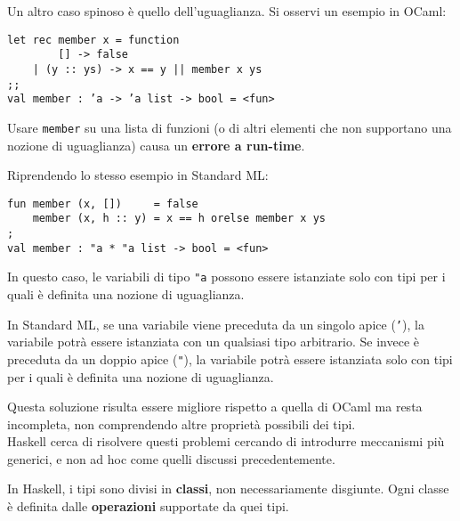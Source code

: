 \documentclass{article}
\begin{document}
\pagebreak

Un altro caso spinoso è quello dell'uguaglianza. Si osservi un esempio in OCaml:
\begin{tcolorbox}
\begin{verbatim}
let rec member x = function
        [] -> false
    | (y :: ys) -> x == y || member x ys
;;
val member : ’a -> ’a list -> bool = <fun>
\end{verbatim}
\end{tcolorbox}
Usare \texttt{member} su una lista di funzioni (o di altri elementi che non supportano una nozione di uguaglianza) causa un \textbf{errore a run-time}.

Riprendendo lo stesso esempio in Standard ML:
\begin{tcolorbox}
\begin{verbatim}
fun member (x, [])     = false
    member (x, h :: y) = x == h orelse member x ys
;
val member : "a * "a list -> bool = <fun>
\end{verbatim}
\end{tcolorbox}
In questo caso, le variabili di tipo \texttt{"a} possono essere istanziate solo con tipi per i quali è definita una nozione di uguaglianza.

In Standard ML, se una variabile viene preceduta da un singolo apice (\texttt{'}), la variabile potrà essere istanziata con un qualsiasi tipo arbitrario. Se invece è preceduta da un doppio apice (\texttt{"}), la variabile potrà essere istanziata solo con tipi per i quali è definita una nozione di uguaglianza.

Questa soluzione risulta essere migliore rispetto a quella di OCaml ma resta incompleta, non comprendendo altre proprietà possibili dei tipi.\vspace{14pt}\\
Haskell cerca di risolvere questi problemi cercando di introdurre meccanismi più generici, e non ad hoc come quelli discussi precedentemente.

In Haskell, i tipi sono divisi in \textbf{classi}, non necessariamente disgiunte. Ogni classe è definita dalle \textbf{operazioni} supportate da quei tipi.
\end{document}
